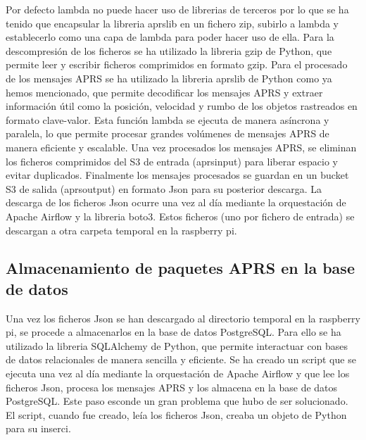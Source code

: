 Por defecto lambda no puede hacer uso de librerias de terceros por lo que se ha tenido que encapsular la libreria aprslib en un fichero zip, subirlo a lambda y establecerlo como una capa de lambda para poder hacer uso de ella.
Para la descompresión de los ficheros se ha utilizado la libreria gzip de Python, que permite leer y escribir ficheros comprimidos en formato gzip. 
Para el procesado de los mensajes APRS se ha utilizado la libreria aprslib de Python como ya hemos mencionado, que permite decodificar los mensajes APRS y extraer información útil como la posición, velocidad y rumbo de los objetos rastreados en formato clave-valor.
Esta función lambda se ejecuta de manera asíncrona y paralela, lo que permite procesar grandes volúmenes de mensajes APRS de manera eficiente y escalable. Una vez procesados los mensajes APRS, se eliminan los ficheros comprimidos del S3 de entrada (aprsinput) para liberar espacio y evitar duplicados.
Finalmente los mensajes procesados se guardan en un bucket S3 de salida (aprsoutput) en formato Json para su posterior descarga. La descarga de los ficheros Json ocurre una vez al día mediante la orquestación de Apache Airflow y la libreria boto3. Estos ficheros (uno por fichero de entrada) se descargan a otra carpeta temporal en la raspberry pi.


\subsection{Almacenamiento de paquetes APRS en la base de datos}
Una vez los ficheros Json se han descargado al directorio temporal en la raspberry pi, se procede a almacenarlos en la base de datos PostgreSQL. Para ello se ha utilizado la libreria SQLAlchemy de Python, que permite interactuar con bases de datos relacionales de manera sencilla y eficiente. Se ha creado un script que se ejecuta una vez al día mediante la orquestación de Apache Airflow y que lee los ficheros Json, procesa los mensajes APRS y los almacena en la base de datos PostgreSQL.
Este paso esconde un gran problema que hubo de ser solucionado. El script, cuando fue creado, leía los ficheros Json, creaba un objeto de Python para su inserci. 
